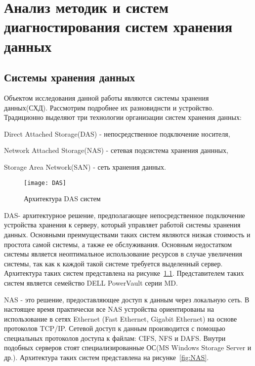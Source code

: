 \chapter{Анализ методик и систем диагностирования систем хранения данных}
\section{Системы хранения данных}
Объектом исследования данной работы являются системы хранения данных(СХД). Рассмотрим подробнее их разновиднсти и устройство. 
Традиционно выделяют три технологии организации систем хранения данных: 
\begin{itemize*}
	\item{Direct Attached Storage(DAS) - непосредственное подключение носителя,}
	\item{Network Attached Storage(NAS) - сетевая подсистема хранения даннных,}
	\item{Storage Area Network(SAN) - сеть хранения данных.}
\end{itemize*}

\begin{figure}[!h]
	\centering
	\texttt{[image: DAS]}
	\caption{Архитектура DAS систем}
	\label{fig:DAS}
\end{figure}

DAS- архитектурное решение, предполагающее непосредственное подключение устройства хранения к серверу, который управляет работой системы хранения данных. Основными преимуществами таких систем являются низкая стоимость и простота самой системы, а также ее обслуживания. Основным недостатком системы является неоптимальное использование ресурсов в случае увеличения системы, так как к каждой такой системе требуется выделенный сервер. Архитектура таких систем представлена на рисунке~\ref{fig:DAS}. Представителем таких систем является семейство DELL PowerVault серии MD.

NAS - это решение, предоставляющее доступ к данным через локальную сеть. В настоящее время практически все NAS устройства ориентированы на использование в сетях Ethernet (Fast Ethernet, Gigabit Ethernet) на основе протоколов TCP/IP. Сетевой доступ к данным производится с помощью специальных протоколов доступа к файлам: CIFS, NFS и DAFS. Внутри подобных серверов стоят специализированные ОС(MS Windows Storage Server и др.). Архитектура таких систем представлена на рисунке~\ref{fig:NAS}.

